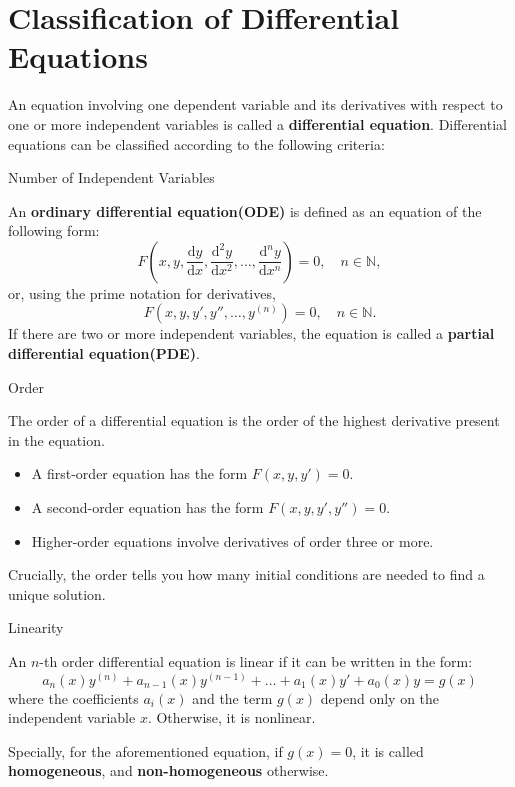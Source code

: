 \documentclass[11pt]{elegantbook}
\begin{document}
\section{Classification of Differential Equations} %
An equation involving one dependent variable and its derivatives with respect to one or more independent variables 
is called a \textbf{differential equation}.
Differential equations can be classified according to the following criteria:
\begin{leftbarTitle}{Number of Independent Variables}\end{leftbarTitle}
An \textbf{ordinary differential equation(ODE)} is defined as an equation of the following form:
\begin{equation}\label{eq:plain ODE}
F\left( x, y, \frac{\mathrm{d}y}{\mathrm{d}x}, \frac{\mathrm{d}^2y}{\mathrm{d}x^2}, \ldots, \frac{\mathrm{d}^ny}{\mathrm{d}x^n} \right) = 0,\quad n \in \mathbb{N},
\end{equation}
or, using the prime notation for derivatives,
\begin{equation*}
F\left( x, y, y', y'', \ldots, y^{(n)} \right) = 0,\quad n \in \mathbb{N}.
\end{equation*}
If there are two or more independent variables, the equation is called a \textbf{partial differential equation(PDE)}.
\begin{leftbarTitle}{Order}\end{leftbarTitle}
The order of a differential equation is the order of the highest derivative present in the equation.
\begin{itemize}
    \item A first-order equation has the form $ F(x, y, y') = 0 $.
    \item A second-order equation has the form $ F(x, y, y', y'') = 0 $.
    \item Higher-order equations involve derivatives of order three or more.
\end{itemize}
\begin{note}
    Crucially, the order tells you how many initial conditions are needed to find a unique solution.
\end{note}
\begin{leftbarTitle}{Linearity}\end{leftbarTitle}
An $n$-th order differential equation is linear if it can be written in the form: 
\begin{equation*}
    a_n(x)y^{(n)} + a_{n-1}(x)y^{(n-1)} + \dots + a_1(x)y' + a_0(x)y = g(x)
\end{equation*}
where the coefficients $a_{i}(x)$ and the term $g(x)$ depend only on the independent variable $x$.
Otherwise, it is nonlinear.
\begin{note}
    Specially, for the aforementioned equation, if $g(x) = 0$, it is called \textbf{homogeneous},
    and \textbf{non-homogeneous} otherwise.
\end{note}
\end{document}
